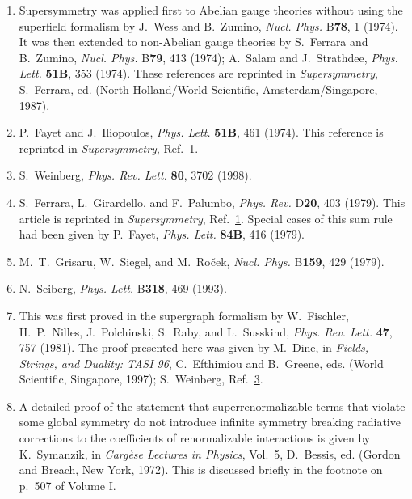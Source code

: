 \begin{enumerate}
  \item {}\label{ch27-ref-1}
  Supersymmetry was applied first to Abelian gauge theories without
  using the superfield formalism by J.~Wess and B.~Zumino,
  \textit{Nucl. Phys.} B\textbf{78}, 1 (1974). It was then extended to
  non-Abelian gauge theories by S.~Ferrara and B.~Zumino,
  \textit{Nucl. Phys.} B\textbf{79}, 413 (1974); A.~Salam and
  J.~Strathdee, \textit{Phys. Lett.} \textbf{51B}, 353 (1974). These
  references are reprinted in \textit{Supersymmetry}, S.~Ferrara, ed.
  (North Holland/World Scientific, Amsterdam/Singapore, 1987).

  \item {}\label{ch27-ref-2}
  P.~Fayet and J.~Iliopoulos, \textit{Phys. Lett.} \textbf{51B}, 461
  (1974). This reference is reprinted in \textit{Supersymmetry},
  Ref.~\hyperref[ch27-ref-1]{1}.

  \item {}\label{ch27-ref-3}
  S.~Weinberg, \textit{Phys. Rev. Lett.} \textbf{80}, 3702 (1998).

  \item {}\label{ch27-ref-4}
  S.~Ferrara, L.~Girardello, and F.~Palumbo, \textit{Phys. Rev.}
  D\textbf{20}, 403 (1979). This article is reprinted in
  \textit{Supersymmetry}, Ref.~\hyperref[ch27-ref-1]{1}. Special cases
  of this sum rule had been given by P.~Fayet, \textit{Phys. Lett.}
  \textbf{84B}, 416 (1979).

  \item {}\label{ch27-ref-5}
  M.~T.~Grisaru, W.~Siegel, and M.~Ro\v{c}ek, \textit{Nucl. Phys.}
  B\textbf{159}, 429 (1979).

  \item {}\label{ch27-ref-6}
  N.~Seiberg, \textit{Phys. Lett.} B\textbf{318}, 469 (1993).

  \item {}\label{ch27-ref-7}
  This was first proved in the supergraph formalism by W.~Fischler,
  H.~P.~Nilles, J.~Polchinski, S.~Raby, and L.~Susskind,
  \textit{Phys. Rev. Lett.} \textbf{47}, 757 (1981). The proof presented
  here was given by M.~Dine, in \textit{Fields, Strings, and Duality:
  TASI 96}, C.~Efthimiou and B.~Greene, eds. (World Scientific,
  Singapore, 1997); S.~Weinberg, Ref.~\hyperref[ch27-ref-3]{3}.

  \item {}\label{ch27-ref-8}
  A detailed proof of the statement that superrenormalizable terms that
  violate some global symmetry do not introduce infinite symmetry
  breaking radiative corrections to the coefficients of renormalizable
  interactions is given by K.~Symanzik, in \textit{Carg\`ese Lectures
  in Physics}, Vol.~5, D.~Bessis, ed. (Gordon and Breach, New York,
  1972). This is discussed briefly in the footnote on p.~507 of Volume
  I.


\end{enumerate}
